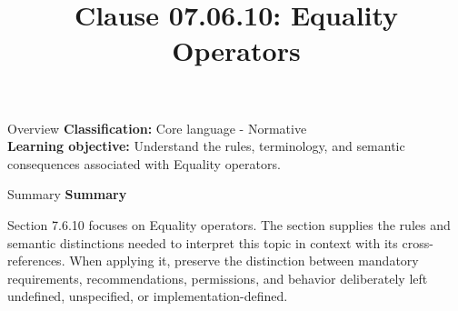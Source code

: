 \documentclass[10pt,letterpaper]{article}
\title{Clause 07.06.10: Equality Operators}
\author{}
\date{}
\begin{document}
\maketitle
\begin{CornellOverviewBox}{Overview}
\textbf{Classification:} Core language - Normative\\[2pt]
\textbf{Learning objective:} Understand the rules, terminology, and semantic consequences associated with Equality operators.
\end{CornellOverviewBox}\begin{CornellSummaryBox}{Summary}
{\sffamily\bfseries\color{Accent} Summary}\par\vspace{3pt}Section 7.6.10 focuses on Equality operators. The section supplies the rules and semantic distinctions needed to interpret this topic in context with its cross-references. When applying it, preserve the distinction between mandatory requirements, recommendations, permissions, and behavior deliberately left undefined, unspecified, or implementation-defined.
\end{CornellSummaryBox}
\end{document}
